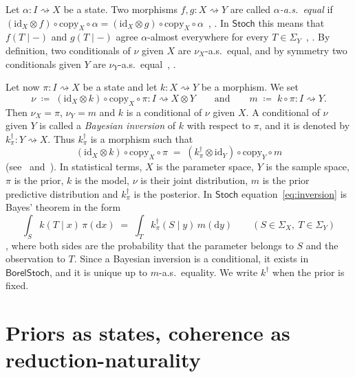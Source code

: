\documentclass[11pt,a4paper]{article}
\theoremstyle{plain}
\theoremstyle{definition}
\theoremstyle{remark}
\newcommand{\cat}[1]{\mathsf{#1}}
\newcommand{\Stoch}{\cat{Stoch}}
\newcommand{\id}{\mathrm{id}}
\newcommand{\BorelStoch}{\cat{BorelStoch}}
\begin{document}
Let $\alpha \colon I \rightsquigarrow X$ be a state. Two morphisms
$f,g \colon X \rightsquigarrow Y$ are called \emph{$\alpha$-a.s.\ equal} if
$(\id_X \otimes f)\circ\mathrm{copy}_X\circ\alpha =
(\id_X \otimes g)\circ\mathrm{copy}_X\circ\alpha$~\cite[Def.~5.1]{cho_disintegration_2019},
\cite[Def.~13.1]{fritz_synthetic_2020}. In $\Stoch$ this means that
$f(T\mid -)$ and $g(T \mid -)$ agree $\alpha$-almost everywhere for every
$T \in \Sigma_Y$~\cite[Prop.~5.3]{cho_disintegration_2019},
\cite[Ex.~13.3]{fritz_synthetic_2020}. By definition, two conditionals of $\nu$
given $X$ are $\nu_X$-a.s.\ equal, and by symmetry two conditionals given $Y$
are $\nu_Y$-a.s.\ equal~\cite[Prop.~5.2]{cho_disintegration_2019},
\cite[Prop.~13.7]{fritz_synthetic_2020}.

Let now $\pi \colon I \rightsquigarrow X$ be a state and let
$k \colon X \rightsquigarrow Y$ be a morphism. We set
\[
\nu \;\coloneqq\; (\id_X \otimes k) \circ \mathrm{copy}_X \circ \pi
\colon I \rightsquigarrow X \otimes Y
\qquad\text{and}\qquad
m \;\coloneqq\; k \circ \pi \colon I \rightsquigarrow Y .
\]
Then $\nu_X = \pi$, $\nu_Y = m$ and $k$ is a conditional of $\nu$ given $X$. A
conditional of $\nu$ given $Y$ is called a \emph{Bayesian inversion} of $k$ with
respect to $\pi$, and it is denoted by
$k^{\dagger}_{\pi} \colon Y \rightsquigarrow X$. Thus $k^{\dagger}_{\pi}$ is a
morphism such that
\begin{equation}\label{eq:inversion}
(\id_X \otimes k)\circ\mathrm{copy}_X\circ\pi
\;=\;
(k^{\dagger}_{\pi} \otimes \id_Y)\circ\mathrm{copy}_Y\circ m
\end{equation}
(see~\cite[eq.~(5)]{cho_disintegration_2019}
and~\cite[eq.~(13.2)]{fritz_synthetic_2020}). In statistical terms, $X$ is the
parameter space, $Y$ is the sample space, $\pi$ is the prior, $k$ is the model,
$\nu$ is their joint distribution, $m$ is the prior predictive distribution and
$k^{\dagger}_{\pi}$ is the posterior. In $\Stoch$
equation~\eqref{eq:inversion} is Bayes' theorem in the form
\[
\int_{S} k(T\mid x)\,\pi(\mathrm{d}x) \;=\;
\int_{T} k^{\dagger}_{\pi}(S \mid y)\,m(\mathrm{d}y)
\qquad (S \in \Sigma_X,\ T \in \Sigma_Y)
\]
\cite[Ex.~3.9]{cho_disintegration_2019}, where both sides are the probability
that the parameter belongs to $S$ and the observation to $T$. Since a Bayesian
inversion is a conditional, it exists in $\BorelStoch$, and it is unique up to
$m$-a.s.\ equality. We write $k^{\dagger}$ when the prior is fixed.

\section{Priors as states, coherence as reduction-naturality}\label{sec:bayes}
\end{document}
